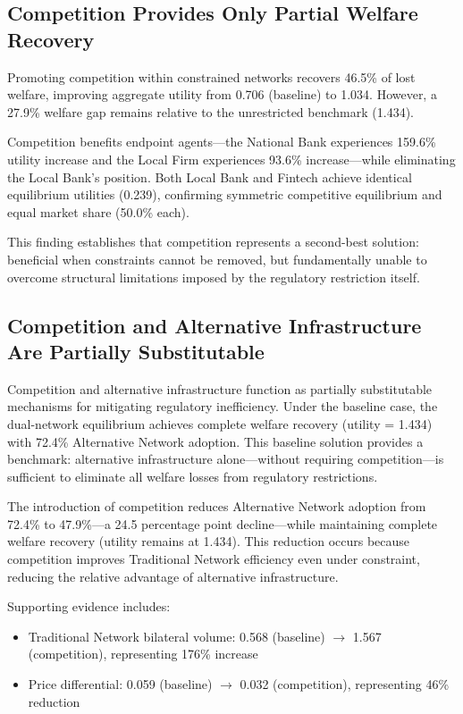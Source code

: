 \subsection{Competition Provides Only Partial Welfare Recovery}

Promoting competition within constrained networks recovers 46.5\% of lost welfare, improving aggregate utility from 0.706 (baseline) to 1.034. However, a 27.9\% welfare gap remains relative to the unrestricted benchmark (1.434).

Competition benefits endpoint agents—the National Bank experiences 159.6\% utility increase and the Local Firm experiences 93.6\% increase—while eliminating the Local Bank's position. Both Local Bank and Fintech achieve identical equilibrium utilities (0.239), confirming symmetric competitive equilibrium and equal market share (50.0\% each).

This finding establishes that competition represents a second-best solution: beneficial when constraints cannot be removed, but fundamentally unable to overcome structural limitations imposed by the regulatory restriction itself.

\subsection{Competition and Alternative Infrastructure Are Partially Substitutable}

Competition and alternative infrastructure function as partially substitutable mechanisms for mitigating regulatory inefficiency. Under the baseline case, the dual-network equilibrium achieves complete welfare recovery (utility = 1.434) with 72.4\% Alternative Network adoption. This baseline solution provides a benchmark: alternative infrastructure alone—without requiring competition—is sufficient to eliminate all welfare losses from regulatory restrictions.

The introduction of competition reduces Alternative Network adoption from 72.4\% to 47.9\%—a 24.5 percentage point decline—while maintaining complete welfare recovery (utility remains at 1.434). This reduction occurs because competition improves Traditional Network efficiency even under constraint, reducing the relative advantage of alternative infrastructure.

Supporting evidence includes:
\begin{itemize}
    \item Traditional Network bilateral volume: 0.568 (baseline) $\rightarrow$ 1.567 (competition), representing 176\% increase
    \item Price differential: 0.059 (baseline) $\rightarrow$ 0.032 (competition), representing 46\% reduction
\end{itemize}


